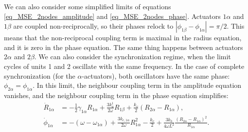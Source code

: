 \documentclass[11pt, a4paper]{article} %
\begin{document}
We can also consider some simplified limits of equations \eqref{eq_MSE_2nodes_amplitude} and \eqref{eq_MSE_2nodes_phase}. 
Actuators $1\alpha$ and $1\beta$ are coupled non-reciprocally, so their phases relock to $|\phi_{1\beta} - \phi_{1\alpha}| = \pi/2$. 
This means that the non-reciprocal coupling term is maximal in the radius equation, and it is zero in the phase equation.
The same thing happens between actuators $2\alpha$ and $2\beta$. 
We can also consider the synchronization regime, when the limit cycles of units 1 and 2 oscillate with the same frequency. 
In the case of complete synchronization (for the $\alpha$-actuators), both oscillators have the same phase: $\phi_{2\alpha} = \phi_{1\alpha}$. 
In this limit, the neighbour coupling term in the amplitude equation vanishes, and the neighbour coupling term 
in the phase equation simplifies:
\begin{align}
\dot{R}_{1\alpha} &= -\frac{1}{2} \gamma_{1\alpha} R_{1\alpha} + \frac{3k_a^{1}}{2\omega} R_{1\beta} 
+ \frac{k_v}{2}(R_{2\alpha} - R_{1\alpha}),  \label{eq_sync_amplitude_simplified}\\
\dot{\phi}_{1\alpha} &= -(\omega - \omega_{1\alpha}) + \frac{3k_{c,1\alpha}}{2\omega} R_{1\alpha}^2 
- \frac{k_v}{2} + \frac{3k_b}{4\omega L^2} \frac{(R_{2\alpha}-R_{1\alpha})^2}{R_{1\alpha}}.
\end{align}
\end{document}

